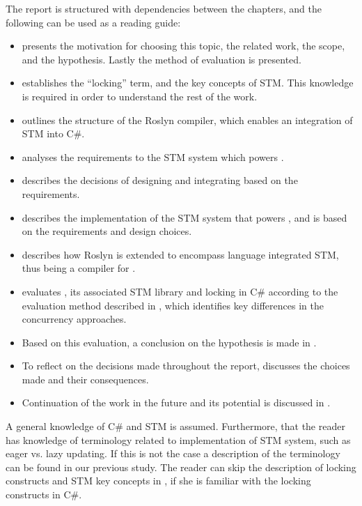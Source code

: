 The report is structured with dependencies between the chapters, and the following can be used as a reading guide:
\begin{itemize}
	\item {} presents the motivation for choosing this topic, the related work, the scope, and the hypothesis. Lastly the method of evaluation is presented.
	\item {} establishes the ``locking'' term, and the key concepts of \ac{STM}. This knowledge is required in order to understand the rest of the work.
	\item {} outlines the structure of the Roslyn compiler, which enables an integration of \ac{STM} into C\#.
	\item {} analyses the requirements to the \ac{STM} system which powers \stmname.
	\item {} describes the decisions of designing and integrating \stmname based on the requirements.
	\item {} describes the implementation of the \ac{STM} system that powers \stmname, and is based on the requirements and design choices.
	\item {} describes how Roslyn is extended to encompass language integrated \ac{STM}, thus being a compiler for \stmname.
	\item {} evaluates \stmname, its associated \ac{STM} library and locking in C\# according to the evaluation method described in , which identifies key differences in the concurrency approaches.
	\item Based on this evaluation, a conclusion on the hypothesis is made in .
	 \item To reflect on the decisions made throughout the report,  discusses the choices made and their consequences.
	 \item Continuation of the work in the future and its potential is discussed in .
\end{itemize}


A general knowledge of C\# and \ac{STM} is assumed. Furthermore, that the reader has knowledge of terminology related to implementation of \ac{STM} system, such as eager vs. lazy updating. If this is not the case a description of the terminology can be found in our previous study\cite[p. 53]{dpt907e14trending}. The reader can skip the description of locking constructs and \ac{STM} key concepts in , if she is familiar with the locking constructs in C\#.

